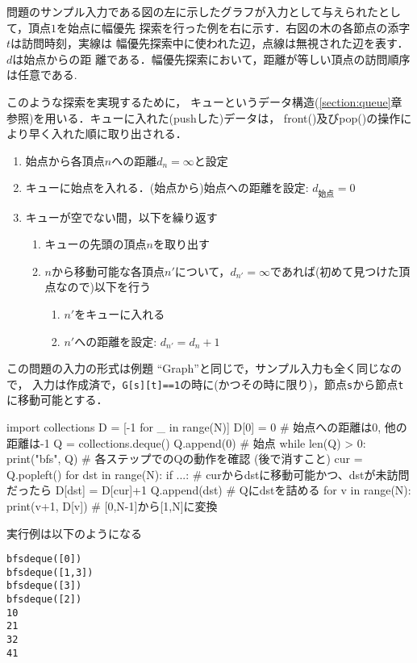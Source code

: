 問題のサンプル入力である図の左に示したグラフが入力として与えられたとして，頂点$1$を始点に幅優先
探索を行った例を右に示す．右図の木の各節点の添字$t$は訪問時刻，実線は
幅優先探索中に使われた辺，点線は無視された辺を表す．$d$は始点からの距
離である．幅優先探索において，距離が等しい頂点の訪問順序は任意である.

このような探索を実現するために，
キューというデータ構造(\ref{section:queue}章参照)を用いる．キューに入れた(pushした)データは，
front()及びpop()の操作により早く入れた順に取り出される．
\begin{enumerate}
\item 始点から各頂点$n$への距離$d_{n}=\infty$と設定
\item キューに始点を入れる．(始点から)始点への距離を設定: $d_{\text{始点}}=0$
\item キューが空でない間，以下を繰り返す
  \begin{enumerate}
  \item キューの先頭の頂点$n$を取り出す
  \item $n$から移動可能な各頂点$n'$について，$d_{n'}=\infty$であれば(初めて見つけた頂点なので)以下を行う
    \begin{enumerate}
    \item $n'$をキューに入れる
    \item $n'$への距離を設定: $d_{n'}=d_n+1$
    \end{enumerate}
  \end{enumerate}
\end{enumerate}


この問題の入力の形式は例題 ``Graph''と同じで，サンプル入力も全く同じなので，
入力は作成済で，\texttt{G[s][t]==1}の時に(かつその時に限り)，節点\texttt{s}から節点\texttt{t}に移動可能とする．

\begin{pybox}
import collections
D = [-1 for _ in range(N)]
D[0] = 0 # 始点への距離は0, 他の距離は-1
Q = collections.deque()
Q.append(0)                     # 始点
while len(Q) > 0:
    print("bfs", Q) # 各ステップでのQの動作を確認 (後で消すこと)
    cur = Q.popleft()
    for dst in range(N):
        if ...: # curからdstに移動可能かつ、dstが未訪問だったら \label{code:bfspy:visit}
            D[dst] = D[cur]+1
            Q.append(dst) # Qにdstを詰める
for v in range(N):
    print(v+1, D[v])        # [0,N-1]から[1,N]に変換
\end{pybox}

実行例は以下のようになる
\begin{alltt}
bfs deque([0])
bfs deque([1, 3])
bfs deque([3])
bfs deque([2])
1 0
2 1
3 2
4 1
\end{alltt}

